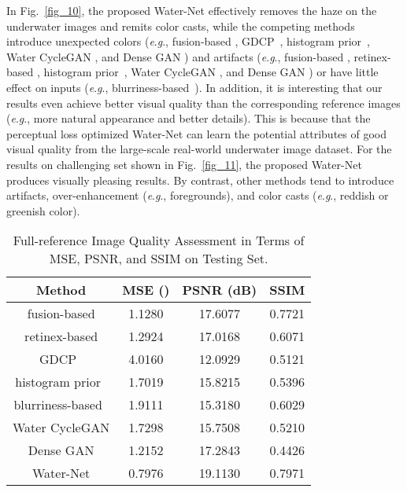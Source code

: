 \documentclass[journal]{IEEEtran}
\newcommand{\eg}{\textit{e}.\textit{g}.}
\begin{document}
In Fig.~\ref{fig_10}, the proposed Water-Net effectively removes the haze on the underwater images and remits color casts, while the competing  methods introduce unexpected colors (\eg, fusion-based \cite{Ancuti2012}, GDCP~\cite{Peng2018}, histogram prior~\cite{Li2016}, Water CycleGAN \cite{Emerging}, and Dense GAN \cite{Guo2019}) and artifacts (\eg, fusion-based \cite{Ancuti2012}, retinex-based \cite{Fu2014}, histogram prior~\cite{Li2016}, Water CycleGAN \cite{Emerging}, and Dense GAN \cite{Guo2019}) or have little effect on inputs (\eg, blurriness-based~\cite{Peng2017}). In addition, it is interesting that our results even achieve better visual quality than the corresponding reference images (\eg, more natural appearance and better details). This is because that the perceptual loss optimized Water-Net can learn the potential attributes of good visual quality from the large-scale real-world underwater image dataset. For the results on challenging set shown in Fig.~\ref{fig_11}, the proposed Water-Net produces visually pleasing results. By contrast, other methods tend to introduce artifacts, over-enhancement (\eg, foregrounds), and color casts (\eg, reddish or greenish color).


\begin{table}[htbp]
\caption{Full-reference Image Quality Assessment in Terms of MSE, PSNR, and SSIM on Testing Set.}
 \centering
\begin{tabular}{c|c|c|c}
  \hline
  \textbf{Method} & \textbf{MSE ()} & \textbf{PSNR (dB)}  & \textbf{SSIM}  \\
  \hline
  fusion-based \cite{Ancuti2012} & \textcolor[rgb]{0.00,0.07,1.00}{1.1280} & \textcolor[rgb]{0.00,0.07,1.00}{17.6077} & \textcolor[rgb]{0.00,0.07,1.00}{0.7721}\\
  retinex-based \cite{Fu2014} & 1.2924 & 17.0168 & 0.6071\\
  GDCP~\cite{Peng2018} & 4.0160 & 12.0929&0.5121\\
  histogram prior~\cite{Li2016} & 1.7019 & 15.8215
  & 0.5396\\
  blurriness-based~\cite{Peng2017} & 1.9111& 15.3180&0.6029 \\
  Water CycleGAN \cite{Emerging} &  1.7298 & 15.7508 & 0.5210\\
  Dense GAN \cite{Guo2019} &  1.2152 &  17.2843 & 0.4426 \\
  Water-Net &  \textcolor[rgb]{1.00,0.00,0.00}{0.7976} & \textcolor[rgb]{1.00,0.00,0.00}{19.1130} & \textcolor[rgb]{1.00,0.00,0.00}{0.7971}\\
  \hline
\end{tabular}
\vspace{\baselineskip}
\label{table_5}
\end{table}
\end{document}
